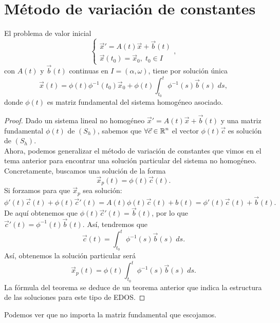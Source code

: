 \section{Método de variación de constantes}
\begin{theorem}
El problema de valor inicial
\[
\begin{cases}
\vec{x}' = A\left(t\right)\vec{x} + \vec{b}\left(t\right) \\
\vec{x}\left(t_{0}\right)=\vec{x}_{0}, \; t_{0} \in I
\end{cases}
,\]
con $\displaystyle A\left(t\right) $ y $\displaystyle \vec{b}\left(t\right) $ continuas en $\displaystyle I = \left(\alpha, \omega \right) $, tiene por solución única
\[\vec{x}\left(t\right)=\phi\left(t\right)\phi^{-1}\left(t_{0}\right)\vec{x}_{0} + \phi\left(t\right)\int^{t}_{t_{0}} \phi^{-1}\left(s\right)\vec{b}\left(s\right) \; d s ,\]
donde $\displaystyle \phi\left(t\right) $ es matriz fundamental del sistema homogéneo asociado. 
\end{theorem}
\begin{proof}
Dado un sistema lineal no homogéneo $\displaystyle \vec{x}' = A\left(t\right)\vec{x} + \vec{b}\left(t\right) $ y una matriz fundamental $\displaystyle \phi\left(t\right) $ de $\displaystyle \left(S_{h}\right) $, sabemos que $\displaystyle \forall \vec{c} \in \mathbb{R}^{n} $ el vector $\displaystyle \phi\left(t\right)\vec{c} $ es solución de $\displaystyle \left(S_{h}\right) $. \\
Ahora, podemos generalizar el método de variación de constantes que vimos en el tema anterior para encontrar una solución particular del sistema no homogéneo. Concretamente, buscamos una solución de la forma
\[\vec{x}_{p}\left(t\right)=\phi\left(t\right)\vec{c}\left(t\right) .\]
Si forzamos para que $\displaystyle \vec{x}_{p} $ sea solución:
\[\phi'\left(t\right)\vec{c}\left(t\right) + \phi\left(t\right)\vec{c}'\left(t\right)=A\left(t\right)\phi\left(t\right)\vec{c}\left(t\right)+b\left(t\right)=\phi'\left(t\right)\vec{c}\left(t\right)+\vec{b}\left(t\right)  .\]
De aquí obtenemos que $\displaystyle \phi\left(t\right)\vec{c}'\left(t\right)=\vec{b}\left(t\right) $, por lo que $\displaystyle \vec{c}'\left(t\right)=\phi^{-1}\left(t\right)\vec{b}\left(t\right) $. Así, tendremos que
\[\vec{c}\left(t\right)=\int^{t}_{t_{0}} \phi^{-1}\left(s\right)\vec{b}\left(s\right) \; d s .\]
Así, obtenemos la solución particular será
\[\vec{x}_{p}\left(t\right)=\phi\left(t\right)\int^{t}_{t_{0}} \phi^{-1}\left(s\right)\vec{b}\left(s\right) \; d s .\]
La fórmula del teorema se deduce de un teorema anterior que indica la estructura de las soluciones para este tipo de EDOS. 
\end{proof}
\begin{observation}
Podemos ver que no importa la matriz fundamental que escojamos.
\end{observation}

